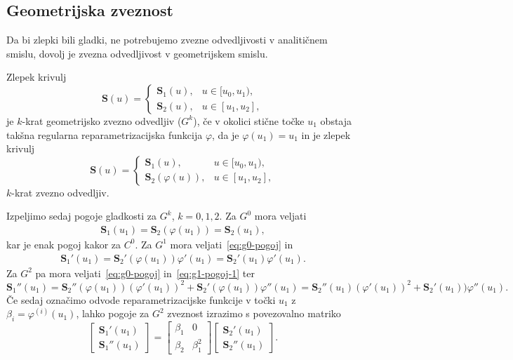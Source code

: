 \documentclass[isrm2, tisk]{fmfdelo}
\begin{document}
    \subsection{Geometrijska zveznost}
    Da bi zlepki bili gladki, ne potrebujemo zvezne odvedljivosti v analitičnem smislu, dovolj je zvezna odvedljivost v geometrijskem smislu.
    \begin{definicija}
        \label{def:geometrijska-zveznost}
        Zlepek krivulj \[\mathbf{S}(u) = \begin{cases}
                                             \mathbf{S}_1(u), & u \in [u_0,u_1),  \\
                                             \mathbf{S}_2(u), & u \in [u_1,u_2],
        \end{cases}\] je $k$-krat geometrijsko zvezno odvedljiv ($G^k$), če v okolici stične točke $u_1$ obstaja takšna regularna reparametrizacijska funkcija $\varphi$, da je $\varphi(u_1)=u_1$ in je zlepek krivulj
        \[\mathbf{S}(u) = \begin{cases}
                              \mathbf{S}_1(u), & u \in [u_0,u_1),  \\
                              \mathbf{S}_2(\varphi(u)), & u \in [u_1,u_2],
        \end{cases}\]
        $k$-krat zvezno odvedljiv.
    \end{definicija}
    \noindent Izpeljimo sedaj pogoje gladkosti za $G^k$, $k=0,1,2$.
    Za $G^0$ mora veljati
    \begin{align}
        \mathbf{S}_1(u_1) =  \mathbf{S}_2(\varphi(u_1))=  \mathbf{S}_2(u_1), \label{eq:g0-pogoj}
    \end{align}
    kar je enak pogoj kakor za $C^0$.
    Za $G^1$ mora veljati~\eqref{eq:g0-pogoj} in \begin{align}
                                                     \mathbf{S}_1'(u_1) = \mathbf{S}_2'(\varphi(u_1))\varphi'(u_1) = \mathbf{S}_2'(u_1)\varphi'(u_1). \label{eq:g1-pogoj-1}
    \end{align}
    Za $G^2$ pa mora veljati~\eqref{eq:g0-pogoj} in~\eqref{eq:g1-pogoj-1} ter \[\mathbf{S}_1''(u_1) = \mathbf{S}_2''(\varphi(u_1))(\varphi'(u_1))^2 +  \mathbf{S}_2'(\varphi(u_1))\varphi''(u_1) =\mathbf{S}_2''(u_1)(\varphi'(u_1))^2 +  \mathbf{S}_2'(u_1))\varphi''(u_1).\]
    Če sedaj označimo odvode reparametrizacijske funkcije v točki $u_1$ z $\beta_i = \varphi^{(i)}(u_1)$, lahko pogoje za $G^2$ zveznost izrazimo s povezovalno matriko
    \[
        \begin{bmatrix}
            \mathbf{S}_1'(u_1) \\
            \mathbf{S}_1''(u_1)
        \end{bmatrix}
        =
        \begin{bmatrix}
            \beta_1 & 0         \\
            \beta_2 & \beta_1^2
        \end{bmatrix}  \begin{bmatrix}
                           \mathbf{S}_2'(u_1) \\
                           \mathbf{S}_2''(u_1)
        \end{bmatrix}.\]
\end{document}
